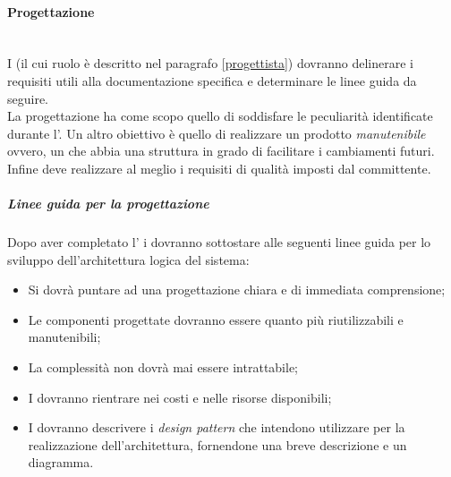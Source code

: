 \paragraph{Progettazione}
	~\\I \progs{} (il cui ruolo è descritto nel paragrafo \ref{progettista}) dovranno delinerare i requisiti utili alla documentazione specifica e determinare le linee guida da seguire.
	~\\La progettazione ha come scopo quello di soddisfare le peculiarità identificate durante l'\AdR. Un altro obiettivo è quello di realizzare un prodotto \emph{manutenibile} ovvero, un 
	 che abbia una struttura in grado di facilitare i cambiamenti futuri.
	\\Infine deve realizzare al meglio i requisiti di qualità imposti dal committente.
	\subparagraph{Linee guida per la progettazione}
	Dopo aver completato l'\AdR{} i \progs{} dovranno sottostare alle seguenti linee guida per lo sviluppo dell'architettura logica del sistema:
	\begin{itemize}
		\item Si dovrà puntare ad una progettazione chiara e di immediata comprensione;
		\item Le componenti progettate dovranno essere quanto più riutilizzabili e manutenibili;
		\item La complessità non dovrà mai essere intrattabile;
		\item I \progs{} dovranno rientrare nei costi e nelle risorse disponibili;
		\item I \progs{} dovranno descrivere i \emph{design pattern} che intendono utilizzare per la realizzazione dell'architettura, fornendone una breve descrizione e un diagramma.
	\end{itemize}
